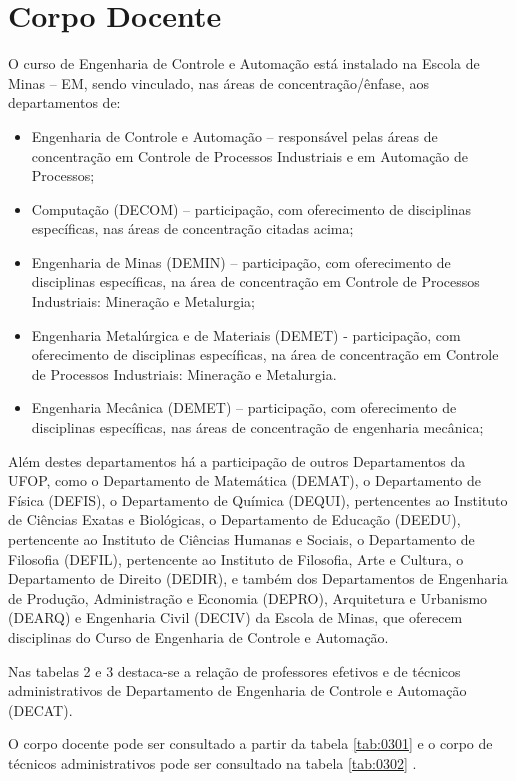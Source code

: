 \section{Corpo Docente}
O curso de Engenharia de Controle e Automação está instalado na Escola de Minas – EM, sendo vinculado, nas áreas de concentração/ênfase, aos departamentos de:
\begin{itemize}
	\item Engenharia de Controle e Automação – responsável pelas áreas de concentração em Controle de Processos Industriais e em Automação de Processos;     
	\item Computação (DECOM) – participação, com oferecimento de disciplinas específicas, nas áreas de concentração citadas acima;
	\item Engenharia de Minas (DEMIN) – participação, com oferecimento de disciplinas específicas, na área de concentração em Controle de Processos Industriais: Mineração e Metalurgia;
	\item Engenharia Metalúrgica e de Materiais (DEMET) - participação, com oferecimento de disciplinas específicas, na área de concentração em Controle de Processos Industriais: Mineração e Metalurgia.
	\item Engenharia Mecânica (DEMET) – participação, com oferecimento de disciplinas específicas, nas áreas de concentração de engenharia mecânica; 
\end{itemize} 

Além destes departamentos há a participação de outros Departamentos da UFOP, como o Departamento de Matemática (DEMAT), o Departamento de Física (DEFIS), o Departamento de Química (DEQUI), pertencentes ao Instituto de Ciências Exatas e Biológicas, o Departamento de Educação (DEEDU), pertencente ao Instituto de Ciências Humanas e Sociais, o Departamento de Filosofia (DEFIL), pertencente ao Instituto de Filosofia, Arte e Cultura, o Departamento de Direito (DEDIR), e também dos Departamentos de Engenharia de Produção, Administração e Economia (DEPRO), Arquitetura e Urbanismo (DEARQ) e Engenharia Civil (DECIV) da Escola de Minas, que oferecem disciplinas do Curso de Engenharia de Controle e Automação.

Nas tabelas 2 e 3 destaca-se a relação de professores efetivos e de técnicos administrativos de Departamento de Engenharia de Controle e Automação (DECAT).  

O corpo docente pode ser consultado a partir da tabela \ref{tab:0301} e o corpo de técnicos administrativos pode ser consultado na tabela \ref{tab:0302} .

